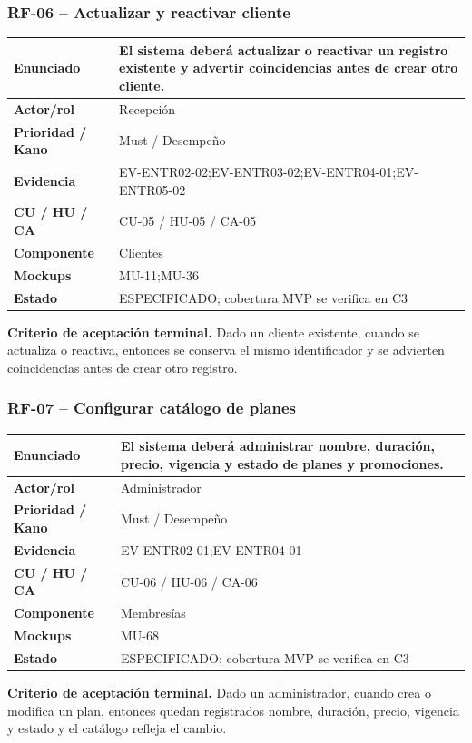 \documentclass[11pt,a4paper,twoside]{article}
\begin{document}
\subsubsection{RF-06 -- Actualizar y reactivar cliente}
\begin{tabularx}{\textwidth}{|>{\bfseries}p{3.2cm}|X|}\hline
Enunciado & El sistema deberá actualizar o reactivar un registro existente y advertir coincidencias antes de crear otro cliente. \\ \hline
Actor/rol & Recepción \\ \hline
Prioridad / Kano & Must / Desempeño \\ \hline
Evidencia & EV-ENTR02-02;EV-ENTR03-02;EV-ENTR04-01;EV-ENTR05-02 \\ \hline
CU / HU / CA & CU-05 / HU-05 / CA-05 \\ \hline
Componente & Clientes \\ \hline
Mockups & MU-11;MU-36 \\ \hline
Estado & ESPECIFICADO; cobertura MVP se verifica en C3 \\ \hline
\end{tabularx}
\textbf{Criterio de aceptación terminal.} Dado un cliente existente, cuando se actualiza o reactiva, entonces se conserva el mismo identificador y se advierten coincidencias antes de crear otro registro.
\subsubsection{RF-07 -- Configurar catálogo de planes}
\begin{tabularx}{\textwidth}{|>{\bfseries}p{3.2cm}|X|}\hline
Enunciado & El sistema deberá administrar nombre, duración, precio, vigencia y estado de planes y promociones. \\ \hline
Actor/rol & Administrador \\ \hline
Prioridad / Kano & Must / Desempeño \\ \hline
Evidencia & EV-ENTR02-01;EV-ENTR04-01 \\ \hline
CU / HU / CA & CU-06 / HU-06 / CA-06 \\ \hline
Componente & Membresías \\ \hline
Mockups & MU-68 \\ \hline
Estado & ESPECIFICADO; cobertura MVP se verifica en C3 \\ \hline
\end{tabularx}
\textbf{Criterio de aceptación terminal.} Dado un administrador, cuando crea o modifica un plan, entonces quedan registrados nombre, duración, precio, vigencia y estado y el catálogo refleja el cambio.
\end{document}
